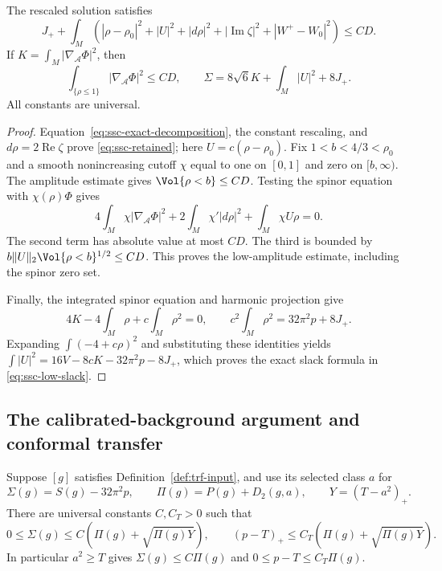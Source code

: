 \begin{lemma}
\label{lem:ssc-retained}
The rescaled solution satisfies
\begin{equation}\label{eq:ssc-retained}
 J_++\int_M\left(|\rho-\rho_0|^2+|U|^2+|d\rho|^2
         +|\operatorname{Im}\zeta|^2+|W^+-W_0|^2\right)
 \le CD.
\end{equation}
If $K=\int_M|\nabla_{\mathcal A}\Phi|^2$, then
\begin{equation}\label{eq:ssc-low-slack}
 \int_{\{\rho\le1\}}|\nabla_{\mathcal A}\Phi|^2\le CD,
 \qquad
 \Sigma=8\sqrt6K+\int_M|U|^2+8J_+.
\end{equation}
All constants are universal.
\end{lemma}

\begin{proof}
Equation~\eqref{eq:ssc-exact-decomposition}, the constant rescaling,
and $d\rho=2\operatorname{Re}\zeta$ prove
\eqref{eq:ssc-retained}; here $U=c(\rho-\rho_0)$.
Fix $1<b<4/3<\rho_0$ and a smooth nonincreasing cutoff $\chi$
equal to one on $[0,1]$ and zero on $[b,\infty)$.
The amplitude estimate gives $\Vol\{\rho<b\}\le CD$.
Testing the spinor equation with $\chi(\rho)\Phi$ gives
\[
 4\int_M\chi|\nabla_{\mathcal A}\Phi|^2
       +2\int_M\chi'|d\rho|^2+\int_M\chi U\rho=0.
\]
The second term has absolute value at most $CD$.  The third is
bounded by $b\|U\|_2\Vol\{\rho<b\}^{1/2}\le CD$.
This proves the low-amplitude estimate, including the spinor zero set.

Finally, the integrated spinor equation and harmonic projection give
\[
 4K-4\int_M\rho+c\int_M\rho^2=0,
 \qquad c^2\int_M\rho^2=32\pi^2p+8J_+.
\]
Expanding $\int(-4+c\rho)^2$ and substituting these identities yields
$\int|U|^2=16V-8cK-32\pi^2p-8J_+$, which proves
the exact slack formula in \eqref{eq:ssc-low-slack}.
\end{proof}

\subsection{The calibrated-background argument and conformal transfer}

\begin{theorem}
\label{thm:ssc-coercivity}
Suppose $[g]$ satisfies Definition~\ref{def:trf-input}, and use its
selected class $a$ for
\[
 \Sigma(g)=S(g)-32\pi^2p,\qquad
 \Pi(g)=P(g)+D_2(g,a),\qquad Y=(T-a^2)_+.
\]
There are universal constants $C,C_T>0$ such that
\begin{equation}\label{eq:ssc-coercivity}
 0\le\Sigma(g)\le C\left(\Pi(g)+\sqrt{\Pi(g)Y}\right),\qquad
 (p-T)_+\le C_T\left(\Pi(g)+\sqrt{\Pi(g)Y}\right).
\end{equation}
In particular $a^2\ge T$ gives $\Sigma(g)\le C\Pi(g)$ and
$0\le p-T\le C_T\Pi(g)$.
\end{theorem}

